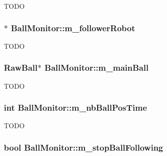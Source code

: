 \label{classBallMonitor_addde606e4f6cd92dc43efd3342ce5f60}
TODO \hypertarget{classBallMonitor_a3411a0f9095e0d0e948a48b015ff1598}{
\subsubsection[{m\_\-followerRobot}]{$\ast$ {\bf BallMonitor::m\_\-followerRobot}}}
\label{classBallMonitor_a3411a0f9095e0d0e948a48b015ff1598}
TODO \hypertarget{classBallMonitor_a4bd064999cb8ee1a286c8dd7ac11ce05}{
\subsubsection[{m\_\-mainBall}]{\setlength{\rightskip}{0pt plus 5cm}RawBall$\ast$ {\bf BallMonitor::m\_\-mainBall}}}
\label{classBallMonitor_a4bd064999cb8ee1a286c8dd7ac11ce05}
TODO \hypertarget{classBallMonitor_a80d4362976840374c4e5c207e6a38c86}{
\subsubsection[{m\_\-nbBallPosTime}]{\setlength{\rightskip}{0pt plus 5cm}int {\bf BallMonitor::m\_\-nbBallPosTime}}}
\label{classBallMonitor_a80d4362976840374c4e5c207e6a38c86}
TODO \hypertarget{classBallMonitor_a306a59cfa638a9e4a4c8b6881b5e7f91}{
\subsubsection[{m\_\-stopBallFollowing}]{\setlength{\rightskip}{0pt plus 5cm}bool {\bf BallMonitor::m\_\-stopBallFollowing}}}
